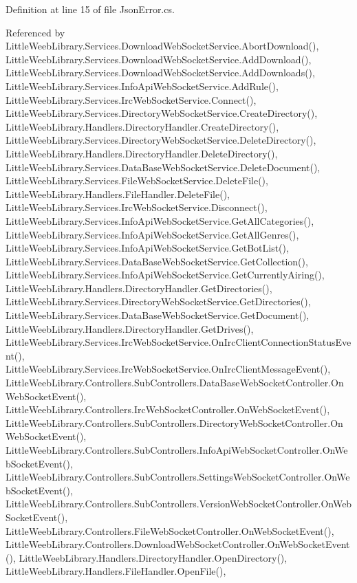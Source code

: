 Definition at line 15 of file Json\+Error.\+cs.



Referenced by Little\+Weeb\+Library.\+Services.\+Download\+Web\+Socket\+Service.\+Abort\+Download(), Little\+Weeb\+Library.\+Services.\+Download\+Web\+Socket\+Service.\+Add\+Download(), Little\+Weeb\+Library.\+Services.\+Download\+Web\+Socket\+Service.\+Add\+Downloads(), Little\+Weeb\+Library.\+Services.\+Info\+Api\+Web\+Socket\+Service.\+Add\+Rule(), Little\+Weeb\+Library.\+Services.\+Irc\+Web\+Socket\+Service.\+Connect(), Little\+Weeb\+Library.\+Services.\+Directory\+Web\+Socket\+Service.\+Create\+Directory(), Little\+Weeb\+Library.\+Handlers.\+Directory\+Handler.\+Create\+Directory(), Little\+Weeb\+Library.\+Services.\+Directory\+Web\+Socket\+Service.\+Delete\+Directory(), Little\+Weeb\+Library.\+Handlers.\+Directory\+Handler.\+Delete\+Directory(), Little\+Weeb\+Library.\+Services.\+Data\+Base\+Web\+Socket\+Service.\+Delete\+Document(), Little\+Weeb\+Library.\+Services.\+File\+Web\+Socket\+Service.\+Delete\+File(), Little\+Weeb\+Library.\+Handlers.\+File\+Handler.\+Delete\+File(), Little\+Weeb\+Library.\+Services.\+Irc\+Web\+Socket\+Service.\+Disconnect(), Little\+Weeb\+Library.\+Services.\+Info\+Api\+Web\+Socket\+Service.\+Get\+All\+Categories(), Little\+Weeb\+Library.\+Services.\+Info\+Api\+Web\+Socket\+Service.\+Get\+All\+Genres(), Little\+Weeb\+Library.\+Services.\+Info\+Api\+Web\+Socket\+Service.\+Get\+Bot\+List(), Little\+Weeb\+Library.\+Services.\+Data\+Base\+Web\+Socket\+Service.\+Get\+Collection(), Little\+Weeb\+Library.\+Services.\+Info\+Api\+Web\+Socket\+Service.\+Get\+Currently\+Airing(), Little\+Weeb\+Library.\+Handlers.\+Directory\+Handler.\+Get\+Directories(), Little\+Weeb\+Library.\+Services.\+Directory\+Web\+Socket\+Service.\+Get\+Directories(), Little\+Weeb\+Library.\+Services.\+Data\+Base\+Web\+Socket\+Service.\+Get\+Document(), Little\+Weeb\+Library.\+Handlers.\+Directory\+Handler.\+Get\+Drives(), Little\+Weeb\+Library.\+Services.\+Irc\+Web\+Socket\+Service.\+On\+Irc\+Client\+Connection\+Status\+Event(), Little\+Weeb\+Library.\+Services.\+Irc\+Web\+Socket\+Service.\+On\+Irc\+Client\+Message\+Event(), Little\+Weeb\+Library.\+Controllers.\+Sub\+Controllers.\+Data\+Base\+Web\+Socket\+Controller.\+On\+Web\+Socket\+Event(), Little\+Weeb\+Library.\+Controllers.\+Irc\+Web\+Socket\+Controller.\+On\+Web\+Socket\+Event(), Little\+Weeb\+Library.\+Controllers.\+Sub\+Controllers.\+Directory\+Web\+Socket\+Controller.\+On\+Web\+Socket\+Event(), Little\+Weeb\+Library.\+Controllers.\+Sub\+Controllers.\+Info\+Api\+Web\+Socket\+Controller.\+On\+Web\+Socket\+Event(), Little\+Weeb\+Library.\+Controllers.\+Sub\+Controllers.\+Settings\+Web\+Socket\+Controller.\+On\+Web\+Socket\+Event(), Little\+Weeb\+Library.\+Controllers.\+Sub\+Controllers.\+Version\+Web\+Socket\+Controller.\+On\+Web\+Socket\+Event(), Little\+Weeb\+Library.\+Controllers.\+File\+Web\+Socket\+Controller.\+On\+Web\+Socket\+Event(), Little\+Weeb\+Library.\+Controllers.\+Download\+Web\+Socket\+Controller.\+On\+Web\+Socket\+Event(), Little\+Weeb\+Library.\+Handlers.\+Directory\+Handler.\+Open\+Directory(), Little\+Weeb\+Library.\+Handlers.\+File\+Handler.\+Open\+File(), 